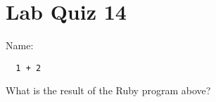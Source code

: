 \documentclass{article}
\begin{document}
\section*{Lab Quiz 14}

\bigskip
\bigskip
Name: \underline{\hspace*{4in}}

\bigskip
\setlength{\parskip}{8pt}

\begin{verbatim}
  1 + 2
\end{verbatim}

\bigskip

What is the result of the Ruby program above?
\end{document}
